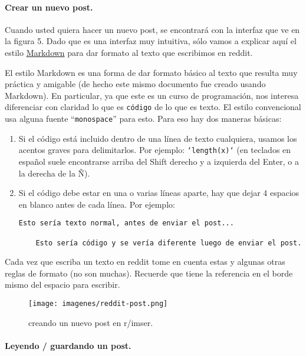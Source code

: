 \documentclass[]{article}
\makeatletter
\def\maxwidth{\ifdim\Gin@nat@width>\linewidth\linewidth
\else\Gin@nat@width\fi}
\let\Oldincludegraphics\includegraphics
\renewcommand{\includegraphics}[1]{\Oldincludegraphics[width=\maxwidth]{#1}}
\makeatother
\begin{document}
\paragraph{Crear un nuevo post.}

Cuando usted quiera hacer un nuevo post, se encontrará con la interfaz
que ve en la figura 5. Dado que es una interfaz muy intuitiva, sólo
vamos a explicar aquí el estilo
\href{http://daringfireball.net/projects/markdown/syntax}{Markdown} para
dar formato al texto que escribimos en reddit.

El estilo Markdown es una forma de dar formato básico al texto que
resulta muy práctica y amigable (de hecho este mismo documento fue
creado usando Markdown). En particular, ya que este es un curso de
programación, nos interesa diferenciar con claridad lo que es
\texttt{código} de lo que es texto. El estilo convencional usa alguna
fuente ``\texttt{monospace}'' para esto. Para eso hay dos maneras
básicas:

\begin{enumerate}[1.]
\item
  Si el código está incluido dentro de una línea de texto cualquiera,
  usamos los acentos graves para delimitarlos. Por ejemplo:
  \texttt{`length(x)`} (en teclados en español suele encontrarse arriba
  del Shift derecho y a izquierda del Enter, o a la derecha de la Ñ).
\item
  Si el código debe estar en una o varias líneas aparte, hay que dejar 4
  espacios en blanco antes de cada línea. Por ejemplo:

\begin{verbatim}
Esto sería texto normal, antes de enviar el post...

    Esto sería código y se vería diferente luego de enviar el post.
\end{verbatim}
\end{enumerate}
Cada vez que escriba un texto en reddit tome en cuenta estas y algunas
otras reglas de formato (no son muchas). Recuerde que tiene la
referencia en el borde mismo del espacio para escribir.

\begin{figure}[htbp]
\centering
\texttt{[image: imagenes/reddit-post.png]}
\caption{creando un nuevo post en r/imser.}
\end{figure}

\paragraph{Leyendo / guardando un post.}
\end{document}
